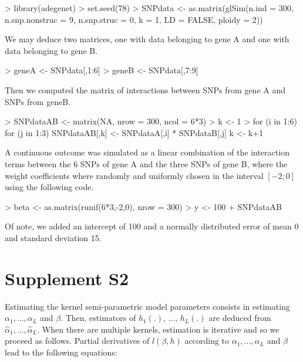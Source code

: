 \begin{example}
> library(adegenet)
> set.seed(78)
> SNPdata <- as.matrix(glSim(n.ind = 300, n.snp.nonstruc = 9, n.snp.struc = 0, k = 1,
  LD = FALSE, ploidy = 2))
\end{example}

\noindent We may deduce two matrices, one with data belonging to gene A and one with data belonging to gene B.

\begin{example}
> geneA <- SNPdata[,1:6]
> geneB <- SNPdata[,7:9]
\end{example}

\noindent Then we computed the matrix of interactions between SNPs from gene A and SNPs from geneB.

\begin{example}
> SNPdataAB <- matrix(NA, nrow = 300, ncol = 6*3)
> k <- 1
> for (i in 1:6) {
    for (j in 1:3) {
      SNPdataAB[,k] <- SNPdataA[,i] * SNPdataB[,j]
      k <- k+1
    }
  }
\end{example}

A continuous outcome was simulated as a linear combination of the interaction terms between the 6 SNPs of gene A and the three SNPs of gene B, where the weight coefficients where randomly and uniformly chosen in the interval $\left[-2;0\right]$ using the following code.

\begin{example}
> beta <- as.matrix(runif(6*3,-2,0), nrow = 300)
> y <- 100 + SNPdataAB %
\end{example}

\noindent Of note, we added an intercept of 100 and a normally distributed error of mean 0 and standard deviation 15.


\section{Supplement S2}

\noindent Estimating the kernel semi-parametric model parameters consists in estimating $\alpha_1, ..., \alpha_L$ and $\beta$. Then, estimators of $h_1(.)$, ..., $h_L(.)$ are deduced from $\hat{\alpha}_1, ..., \hat{\alpha}_L$. When there are multiple kernels, estimation is iterative and so we proceed as follows. Partial derivatives of $l(\beta, h)$ according to $\alpha_1, ..., \alpha_L$ and $\beta$ lead to the following equations: 

